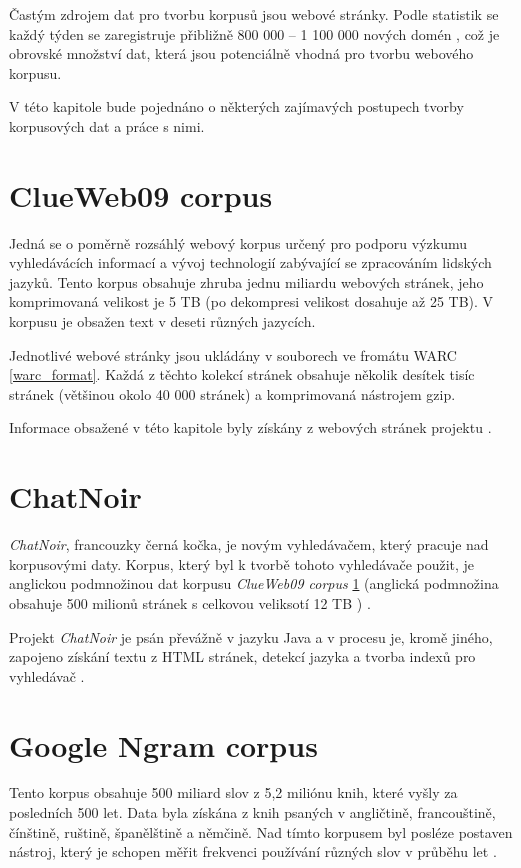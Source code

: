 Častým zdrojem dat pro tvorbu korpusů jsou webové stránky. Podle statistik se
každý týden se zaregistruje přibližně 800 000 -- 1 100 000 nových domén \cite{NEWPAGES},
což je obrovské množství dat, která jsou potenciálně vhodná pro tvorbu webového korpusu.

V této kapitole bude pojednáno o některých zajímavých postupech tvorby korpusových dat
a práce s nimi.

\section{ClueWeb09 corpus}
\label{ClueWeb09}
Jedná se o poměrně rozsáhlý webový korpus určený pro podporu výzkumu vyhledávácích informací
a vývoj technologií zabývající se zpracováním lidských jazyků. Tento korpus obsahuje zhruba
jednu miliardu webových stránek, jeho komprimovaná velikost je 5 TB (po dekompresi velikost
dosahuje až 25 TB). V korpusu je obsažen text v deseti různých jazycích.

Jednotlivé webové stránky jsou ukládány v souborech ve fromátu WARC \ref{warc_format}.
Každá z těchto kolekcí stránek obsahuje několik desítek tisíc stránek (většinou okolo 40 000 stránek) a komprimovaná
nástrojem gzip.

Informace obsažené v této kapitole byly získány z webových stránek projektu \cite{CLUEWEB}.

\section{ChatNoir}
\textit{ChatNoir}, francouzky černá kočka, je novým vyhledávačem, který pracuje nad korpusovými daty. Korpus,
který byl k tvorbě tohoto vyhledávače použit, je anglickou podmnožinou dat korpusu \textit{ClueWeb09 corpus}
\ref{ClueWeb09} (anglická podmnožina obsahuje 500 milionů stránek s celkovou veliksotí 12 TB ) \cite{CHATNOIR}.

Projekt \textit{ChatNoir} je psán převážně v jazyku Java a v procesu je, kromě jiného, zapojeno získání textu z
HTML stránek, detekcí jazyka a tvorba indexů pro vyhledávač \cite{CHATNOIR_GIT}.

\section{Google Ngram corpus}
Tento korpus obsahuje 500 miliard slov z 5,2 miliónu knih, které vyšly za posledních 500 let.
Data byla získána z knih psaných v angličtině, francouštině, čínštině, ruštině,
španělštině a němčině. Nad tímto korpusem byl posléze postaven nástroj, který
je schopen měřit frekvenci používání různých slov v průběhu let \cite{NGRAM}.

